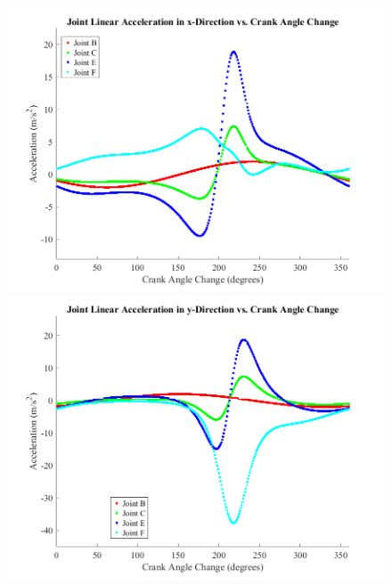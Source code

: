\documentclass[12pt]{article}
\begin{document}
\begin{figure}[ht]
  \centering
  \includegraphics[scale=0.5]{../matlab-plots/linJointAccelX.png}%
  \includegraphics[scale=0.5]{../matlab-plots/linJointAccelY.png}\\


\end{figure}
\end{document}
